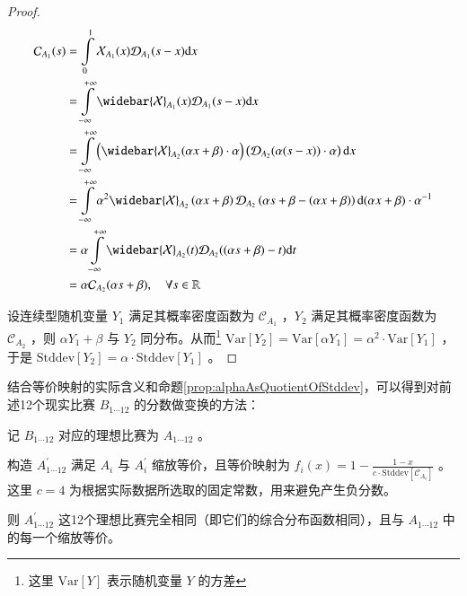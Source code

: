         \begin{proof}
            \begin{align*}
                \mathcal{C}_{A_1}(s)
                &=\int\limits_0^1 \mathcal{X}_{A_1}(x)\mathcal{D}_{A_1}(s-x) \mathrm{d}x \\
                &=\int\limits_{-\infty}^{+\infty} \widebar{\mathcal{X}}_{A_1}(x)\mathcal{D}_{A_1}(s-x) \mathrm{d}x \\
                &=\int\limits_{-\infty}^{+\infty} \left(\widebar{\mathcal{X}}_{A_2}(\alpha x+\beta)\cdot\alpha\right)\left(\mathcal{D}_{A_2}(\alpha(s-x))\cdot\alpha\right) \mathrm{d}x\\
                &=\int\limits_{-\infty}^{+\infty} \alpha^2\widebar{\mathcal{X}}_{A_2}\left(\alpha x+\beta\right)\mathcal{D}_{A_2}\left(\alpha s+\beta-\left(\alpha x+\beta\right)\right) \mathrm{d}(\alpha x+\beta)\cdot\alpha^{-1}\\
                &=\alpha\int\limits_{-\infty}^{+\infty} \widebar{\mathcal{X}}_{A_2}(t)\mathcal{D}_{A_2}((\alpha s+\beta)-t)\mathrm{d} t\\
                &=\alpha\mathcal{C}_{A_2}(\alpha s+\beta),\quad\forall s\in\mathbb{R}
            \end{align*}

            设连续型随机变量 $Y_1$ 满足其概率密度函数为 $\mathcal{C}_{A_1}$ ，$Y_2$ 满足其概率密度函数为 $\mathcal{C}_{A_2}$ ，则 $\alpha Y_1+\beta$ 与 $Y_2$ 同分布。从而\footnote{这里 $\mathrm{Var}\left[Y\right]$ 表示随机变量 $Y$ 的方差} $\mathrm{Var}\left[Y_2\right]=\mathrm{Var}\left[\alpha Y_1\right]=\alpha^2\cdot\mathrm{Var}\left[Y_1\right]$ ，于是 $\mathrm{Stddev}\left[Y_2\right]=\alpha\cdot\mathrm{Stddev}\left[Y_1\right]$ 。
        \end{proof}

        结合等价映射的实际含义和命题\ref{prop:alphaAsQuotientOfStddev}，可以得到对前述12个现实比赛 $B_{1\cdots 12}$ 的分数做变换的方法：
        \begin{asparaenum}[\bfseries{步骤} 1.]
            \item 记 $B_{1\cdots 12}$ 对应的理想比赛为 $A_{1\cdots 12}$ 。
            \item 构造 $A^{\prime}_{1\cdots 12}$ 满足 $A_i$ 与 $A^{\prime}_i$ 缩放等价，且等价映射为 $f_i(x)=1-\frac{1-x}{c\cdot\mathrm{Stddev}\left[\mathcal{C}_{A_i}\right]}$ 。这里 $c=4$ 为根据实际数据所选取的固定常数，用来避免产生负分数。
            \item 则 $A^{\prime}_{1\cdots 12}$ 这12个理想比赛完全相同（即它们的综合分布函数相同），且与 $A_{1\cdots 12}$ 中的每一个缩放等价。
        \end{asparaenum}

